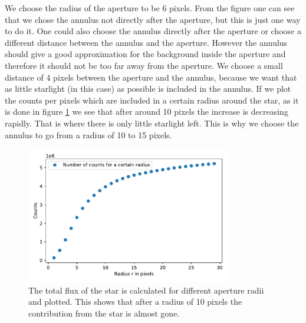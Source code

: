 We choose the radius of the aperture to be 6 pixels. From the figure one can see that we chose the annulus not directly after the aperture, but this is just one way to do it. One could also choose the annulus directly after the aperture or choose a different distance between the annulus and the aperture. However the annulus should give a good approximation for the background inside the aperture and therefore it should not be too far away from the aperture. We choose a small distance of 4 pixels between the aperture and the annulus, because we want that as little starlight (in this case) as possible is included in the annulus. If we plot the counts per pixels which are included in a certain radius around the star, as it is done in figure \ref{fig:annulus_radi} we see that after around 10 pixels the increase is decreasing rapidly. That is where there is only little starlight left. This is why we choose the annulus to go from a radius of 10 to 15 pixels. 
\begin{figure}[H]
	\centering
		\includegraphics[width=0.8\textwidth]{pics/CountsPerRadius.pdf}
		\caption{The total flux of the star is calculated for different aperture radii and plotted. This shows that after a radius of 10 pixels the contribution from the star is almost gone.}
		\label{fig:annulus_radi}
\end{figure}

